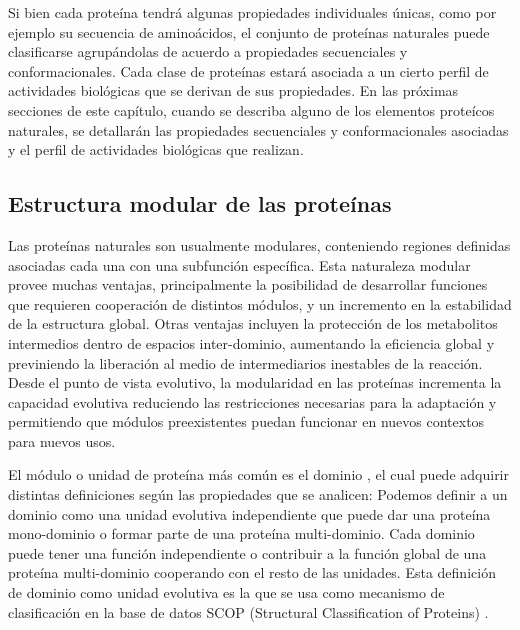 Si bien cada proteína tendrá algunas propiedades individuales únicas, como por ejemplo su secuencia de aminoácidos, 
el conjunto de proteínas naturales puede clasificarse agrupándolas de acuerdo a propiedades secuenciales y conformacionales. 
Cada clase de proteínas estará asociada a un cierto perfil de actividades biológicas que se derivan de sus propiedades.
En las próximas secciones de este capítulo, cuando se describa alguno de los elementos proteícos naturales, 
se detallarán las propiedades secuenciales y conformacionales asociadas y el perfil de actividades biológicas que realizan.












\subsection{Estructura modular de las proteínas}

Las proteínas naturales son usualmente modulares, conteniendo regiones definidas asociadas cada una con una subfunción específica.
Esta naturaleza modular provee muchas ventajas, principalmente la posibilidad de desarrollar funciones que requieren cooperación de distintos módulos, y un incremento en la estabilidad de la estructura global.
Otras ventajas incluyen la protección de los metabolitos intermedios dentro de espacios inter-dominio, aumentando la eficiencia global y previniendo la liberación al medio de intermediarios inestables de la reacción.  
Desde el punto de vista evolutivo, la modularidad en las proteínas incrementa la capacidad evolutiva reduciendo las restricciones necesarias 
para la adaptación y permitiendo que módulos preexistentes puedan funcionar en nuevos contextos para nuevos usos.

El módulo o unidad de proteína más común es el dominio \cite{vogel2004structure}, el cual puede adquirir distintas definiciones según las propiedades que se analicen:
Podemos definir a un dominio como una unidad evolutiva independiente que puede dar una proteína mono-dominio o formar parte de una proteína multi-dominio. 
Cada dominio puede tener una función independiente o contribuir a la función global de una proteína multi-dominio cooperando con el resto de las unidades.
Esta definición de dominio como unidad evolutiva es la que se usa como mecanismo de clasificación en la base de datos SCOP (Structural Classification of Proteins) \cite{murzin1995scop}. 

